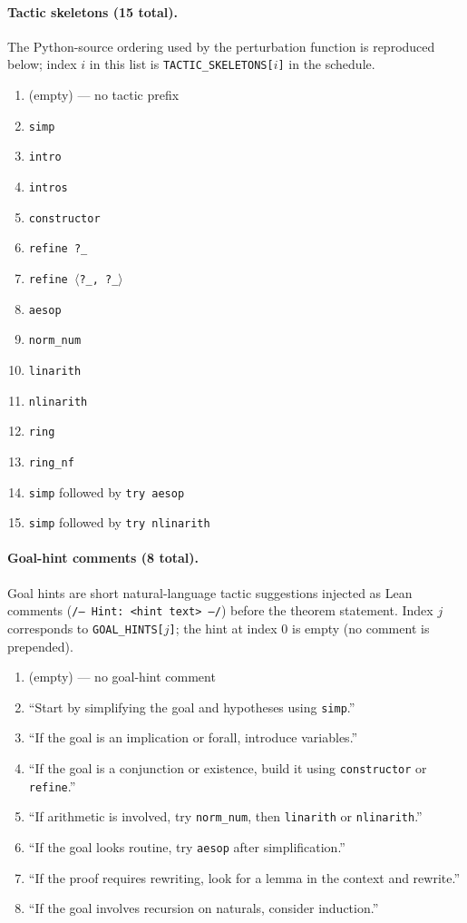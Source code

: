 \documentclass{article}
\begin{document}
\paragraph{Tactic skeletons (15 total).}
The Python-source ordering used by the perturbation function is reproduced below; index $i$ in this list is \texttt{TACTIC\_SKELETONS[$i$]} in the schedule.

\begin{enumerate}[start=0]
\item (empty) --- no tactic prefix
\item \texttt{simp}
\item \texttt{intro}
\item \texttt{intros}
\item \texttt{constructor}
\item \texttt{refine ?\_}
\item \texttt{refine \ensuremath{\langle}?\_,\,?\_\ensuremath{\rangle}}
\item \texttt{aesop}
\item \texttt{norm\_num}
\item \texttt{linarith}
\item \texttt{nlinarith}
\item \texttt{ring}
\item \texttt{ring\_nf}
\item \texttt{simp} followed by \texttt{try aesop}
\item \texttt{simp} followed by \texttt{try nlinarith}
\end{enumerate}

\paragraph{Goal-hint comments (8 total).}
Goal hints are short natural-language tactic suggestions injected as Lean comments (\texttt{/-- Hint: <hint text> --/}) before the theorem statement. Index $j$ corresponds to \texttt{GOAL\_HINTS[$j$]}; the hint at index 0 is empty (no comment is prepended).

\begin{enumerate}[start=0]
\item (empty) --- no goal-hint comment
\item ``Start by simplifying the goal and hypotheses using \texttt{simp}.''
\item ``If the goal is an implication or forall, introduce variables.''
\item ``If the goal is a conjunction or existence, build it using \texttt{constructor} or \texttt{refine}.''
\item ``If arithmetic is involved, try \texttt{norm\_num}, then \texttt{linarith} or \texttt{nlinarith}.''
\item ``If the goal looks routine, try \texttt{aesop} after simplification.''
\item ``If the proof requires rewriting, look for a lemma in the context and rewrite.''
\item ``If the goal involves recursion on naturals, consider induction.''
\end{enumerate}
\end{document}
